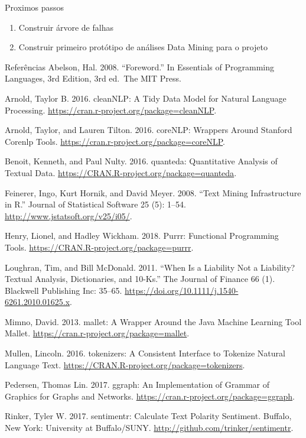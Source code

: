 \documentclass[
  ignorenonframetext,
]{beamer}
\begin{document}
\begin{frame}{Proximos passos}
\protect\hypertarget{proximos-passos}{}
\begin{enumerate}[<+->]
\item
  Construir árvore de falhas
\item
  Construir primeiro protótipo de análises Data Mining para o projeto
\end{enumerate}
\end{frame}

\begin{frame}{Referências}
\protect\hypertarget{referuxeancias}{}
Abelson, Hal. 2008. ``Foreword.'' In Essentials of Programming
Languages, 3rd Edition, 3rd ed.~The MIT Press.

Arnold, Taylor B. 2016. cleanNLP: A Tidy Data Model for Natural Language
Processing. \url{https://cran.r-project.org/package=cleanNLP}.

Arnold, Taylor, and Lauren Tilton. 2016. coreNLP: Wrappers Around
Stanford Corenlp Tools.
\url{https://cran.r-project.org/package=coreNLP}.

Benoit, Kenneth, and Paul Nulty. 2016. quanteda: Quantitative Analysis
of Textual Data. \url{https://CRAN.R-project.org/package=quanteda}.

Feinerer, Ingo, Kurt Hornik, and David Meyer. 2008. ``Text Mining
Infrastructure in R.'' Journal of Statistical Software 25 (5): 1--54.
\url{http://www.jstatsoft.org/v25/i05/}.

Henry, Lionel, and Hadley Wickham. 2018. Purrr: Functional Programming
Tools. \url{https://CRAN.R-project.org/package=purrr}.

Loughran, Tim, and Bill McDonald. 2011. ``When Is a Liability Not a
Liability? Textual Analysis, Dictionaries, and 10-Ks.'' The Journal of
Finance 66 (1). Blackwell Publishing Inc: 35--65.
\url{https://doi.org/10.1111/j.1540-6261.2010.01625.x}.

Mimno, David. 2013. mallet: A Wrapper Around the Java Machine Learning
Tool Mallet. \url{https://cran.r-project.org/package=mallet}.

Mullen, Lincoln. 2016. tokenizers: A Consistent Interface to Tokenize
Natural Language Text.
\url{https://CRAN.R-project.org/package=tokenizers}.

Pedersen, Thomas Lin. 2017. ggraph: An Implementation of Grammar of
Graphics for Graphs and Networks.
\url{https://cran.r-project.org/package=ggraph}.

Rinker, Tyler W. 2017. sentimentr: Calculate Text Polarity Sentiment.
Buffalo, New York: University at Buffalo/SUNY.
\url{http://github.com/trinker/sentimentr}.


\end{frame}
\end{document}
